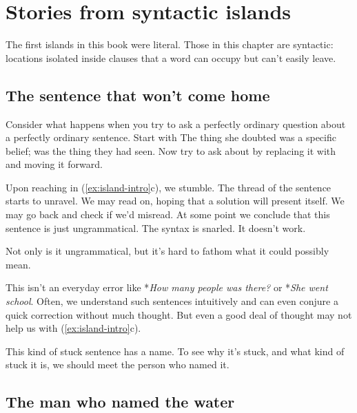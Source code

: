 \chapter{Stories from syntactic islands} \label{sec:extraction-islands}
The first islands in this book were literal. Those in this chapter are syntactic: locations isolated inside clauses that a word can occupy but can't easily leave.

\section{The sentence that won't come home}

Consider what happens when you try to ask a perfectly ordinary question about a perfectly ordinary sentence. Start with  The thing she doubted was a specific belief;  was the thing they had seen. Now try to ask about  by replacing it with  and moving it forward.

\ea
\label{ex:island-intro}
\z\z

Upon reaching  in (\ref{ex:island-intro}c), we stumble. The thread of the sentence starts to unravel. We may read on, hoping that a solution will present itself. We may go back and check if we'd misread. At some point we conclude that this sentence is just ungrammatical. The syntax is snarled. It doesn't work.

Not only is it ungrammatical, but it's hard to fathom what it could possibly mean.

This isn't an everyday error like *\textit{How many people was there?} or *\textit{She went school}. Often, we understand such sentences intuitively and can even conjure a quick correction without much thought. But even a good deal of thought may not help us with (\ref{ex:island-intro}c).

This kind of stuck sentence has a name. To see why it's stuck, and what kind of stuck it is, we should meet the person who named it.

\section{The man who named the water}

